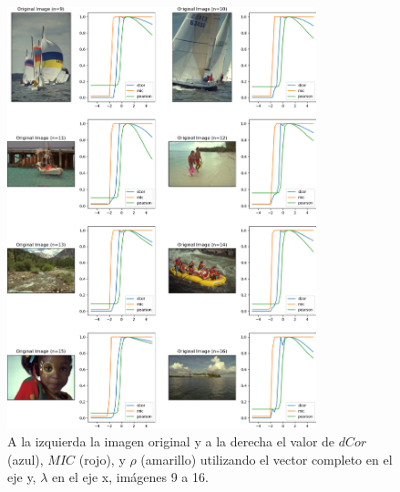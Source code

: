 \begin{figure}
    \centering
    \includegraphics[width=0.8\textwidth]{figuras/full_comp_2.png}
    \caption{A la izquierda la imagen original y a la derecha el valor de $dCor$ (azul), $MIC$ (rojo), y $\rho$ (amarillo) utilizando el vector completo en el eje y, $\lambda$ en el eje x, im\'agenes 9 a 16.}
\end{figure}


